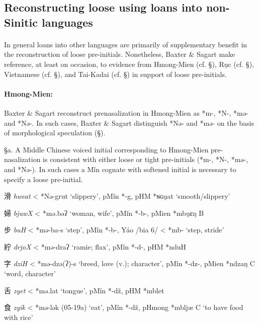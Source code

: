 \subsection{Reconstructing loose using loans into non-Sinitic
languages}\label{reconstructing-loose-using-loans-into-non-sinitic-languages}

\paragraph{}In general loans into other languages are primarily of supplementary
benefit in the reconstruction of loose pre-initials. Nonetheless, Baxter
\& Sagart make reference, at least on occasion, to evidence from
Hmong-Mien (cf. §), Rục (cf. §), Vietnamese (cf. §), and Tai-Kadai (cf.
§) in support of loose pre-initials.

\paragraph{Hmong-Mien:} Baxter \& Sagart
reconstruct prenasalization in Hmong-Mien as *m-, *N-, *mə- and *Nə-. In
such cases, Baxter \& Sagart distinguish *Nə- and *mə- on the basis of
morphological speculation (§).

§a. A Middle Chinese voiced initial corresponding to Hmong-Mien
pre-nasalization is consistent with either loose or tight pre-initials
(*m-, *N-, *mə-, and *Nə-). In such cases a Mǐn cognate with softened
initial is necessary to specify a loose pre-initial.

\begin{description} \item
滑  \emph{hweat} \textless{} *Nə-g{}rut `slippery', pMǐn *-g, pHM *ɴɢu̯at
`smooth/slippery'
\item
婦  \emph{bjuwX} \textless{} *mə.bəʔ `woman, wife', pMǐn *-b-, pMien
*mbu̯ɛŋ B
\item
步  \emph{buH} \textless{} *mə-b{}a-s `step', pMǐn *-b-, Yáo /bia 6/
\textless{} *mb- `step, stride'
\item
紵  \emph{drjoX} \textless{} *mə-draʔ `ramie; flax', pMǐn *-d-, pHM *nduH
\item
字  \emph{dziH} \textless{} *mə-dzə(ʔ)-s `breed, love (v.); character',
pMǐn *-dz-, pMien *ndzaŋ C `word, character'
\item
舌  \emph{zyet} \textless{} *mə.lat `tongue', pMǐn *-dž, pHM *mblet
\item
食  \emph{zyik} \textless{} *mə-lək (05-19a) `eat', pMǐn *-dž, pHmong
*mbljæ C `to have food with rice'
\end{description}

